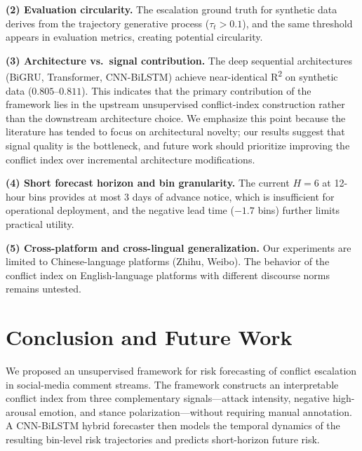 \documentclass[journal]{IEEEtran}
\begin{document}
\textbf{(2) Evaluation circularity.} The escalation ground truth for synthetic data derives from the trajectory generative process ($\tau_t > 0.1$), and the same threshold appears in evaluation metrics, creating potential circularity.

\textbf{(3) Architecture vs.\ signal contribution.} The deep sequential architectures (BiGRU, Transformer, CNN-BiLSTM) achieve near-identical R\textsuperscript{2} on synthetic data ($0.805$--$0.811$). This indicates that the primary contribution of the framework lies in the upstream unsupervised conflict-index construction rather than the downstream architecture choice. We emphasize this point because the literature has tended to focus on architectural novelty; our results suggest that signal quality is the bottleneck, and future work should prioritize improving the conflict index over incremental architecture modifications.

\textbf{(4) Short forecast horizon and bin granularity.} The current $H{=}6$ at 12-hour bins provides at most 3 days of advance notice, which is insufficient for operational deployment, and the negative lead time ($-1.7$ bins) further limits practical utility.

\textbf{(5) Cross-platform and cross-lingual generalization.} Our experiments are limited to Chinese-language platforms (Zhihu, Weibo). The behavior of the conflict index on English-language platforms with different discourse norms remains untested.

\section{Conclusion and Future Work}

We proposed an unsupervised framework for risk forecasting of conflict escalation in social-media comment streams. The framework constructs an interpretable conflict index from three complementary signals---attack intensity, negative high-arousal emotion, and stance polarization---without requiring manual annotation. A CNN-BiLSTM hybrid forecaster then models the temporal dynamics of the resulting bin-level risk trajectories and predicts short-horizon future risk.
\end{document}

